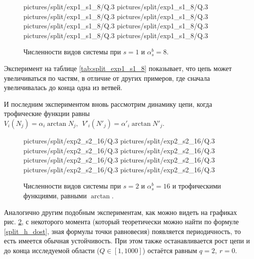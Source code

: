 \begin{figure}[H]
    \centering
       {pictures/split/exp1_s1_8/Q}{.3}
      {pictures/split/exp1_s1_8/Q}{.3}
      {pictures/split/exp1_s1_8/Q}{.3}
      {pictures/split/exp1_s1_8/Q}{.3}
      {pictures/split/exp1_s1_8/Q}{.3}
      {pictures/split/exp1_s1_8/Q}{.3}
      {pictures/split/exp1_s1_8/Q}{.3}
     {pictures/split/exp1_s1_8/Q}{.3}
\caption{Численности видов системы при \(s=1\) и \(\alpha^b_s = 8\).} \label{fig:split_exp1_s1_8}
\end{figure}
Эксперимент на таблице \ref{tab:split_exp1_s1_8} показывает, что цепь может увеличиваться по частям, в отличие от других примеров, где сначала увеличивалась до конца одна из ветвей.

И последним экспериментом вновь рассмотрим динамику цепи, когда трофические функции равны \(V_i(N_j) = \alpha_i \arctan{N_j}, ~~ V'_i(N'_j) = \alpha'_i \arctan{N'_j}\).
\begin{figure}[H]
    \centering
       {pictures/split/exp2_s2_16/Q}{.3}
       {pictures/split/exp2_s2_16/Q}{.3}
      {pictures/split/exp2_s2_16/Q}{.3}
      {pictures/split/exp2_s2_16/Q}{.3}
      {pictures/split/exp2_s2_16/Q}{.3}
      {pictures/split/exp2_s2_16/Q}{.3}
      {pictures/split/exp2_s2_16/Q}{.3}
     {pictures/split/exp2_s2_16/Q}{.3}
\caption{Численности видов системы при \(s=2\) и \(\alpha^b_s = 16\) и трофическими функциями, равными \(\arctan\).} \label{fig:split_exp2_s2_16}
\end{figure}
Аналогично другим подобным экспериментам, как можно видеть на графиках рис. \ref{fig:split_exp2_s2_16}, с некоторого момента (который теоретически можно найти по формуле \eqref{split_h_dost}, зная формулы точки равновесия) появляется периодичность, то есть имеется обычная устойчивость. При этом также останавливается рост цепи и до конца исследуемой области (\(Q \in [1, 1000]\)) остаётся равным \(q=2, ~ r=0\).
